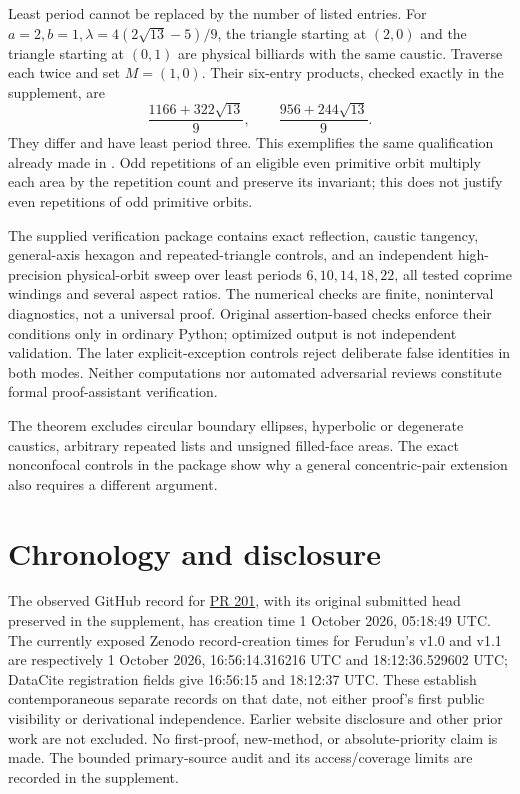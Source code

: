 \documentclass[11pt]{article}
\begin{document}
Least period cannot be replaced by the number of listed entries.
For \(a=2,b=1,\lambda=4(2\sqrt{13}-5)/9\), the triangle starting at
\((2,0)\) and the triangle starting at \((0,1)\) are physical billiards
with the same caustic. Traverse each twice and set \(M=(1,0)\).
Their six-entry products, checked exactly in the supplement, are
\[
 \frac{1166+322\sqrt{13}}9,\qquad
 \frac{956+244\sqrt{13}}9.
\]
They differ and have least period three. This exemplifies the same
qualification already made in \cite[Section 7]{ferudun10}.
Odd repetitions of an eligible even primitive orbit multiply each area
by the repetition count and preserve its invariant; this does not
justify even repetitions of odd primitive orbits.

The supplied verification package contains exact reflection, caustic
tangency, general-axis hexagon and repeated-triangle controls, and an
independent high-precision physical-orbit sweep over least periods
\(6,10,14,18,22\), all tested coprime windings and several aspect ratios.
The numerical checks are finite, noninterval diagnostics, not a universal
proof. Original assertion-based checks enforce their conditions only in
ordinary Python; optimized output is not independent validation.
The later explicit-exception controls reject deliberate false identities
in both modes. Neither computations nor automated adversarial reviews
constitute formal proof-assistant verification.

The theorem excludes circular boundary ellipses, hyperbolic or degenerate
caustics, arbitrary repeated lists and unsigned filled-face areas.
The exact nonconfocal controls in the package show why a general
concentric-pair extension also requires a different argument.

\section{Chronology and disclosure}
The observed GitHub record for \href{https://github.com/AlecKriebel/Math/pull/201}
{PR 201}, with its original submitted head preserved in the supplement,
has creation time 1 October 2026, 05:18:49 UTC.
The currently exposed Zenodo record-creation times for Ferudun's v1.0
and v1.1 are respectively 1 October 2026, 16:56:14.316216 UTC and
18:12:36.529602 UTC; DataCite registration fields give 16:56:15 and
18:12:37 UTC. These establish contemporaneous separate records on that
date, not either proof's first public visibility or derivational
independence. Earlier website disclosure and other prior work are not
excluded. No first-proof, new-method, or absolute-priority claim is made.
The bounded primary-source audit and its access/coverage limits are
recorded in the supplement.
\end{document}
